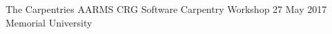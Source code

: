 \begin{cventries}
  \cventry
    {The Carpentries} %
    {AARMS CRG Software Carpentry Workshop} %
    {27 May 2017} %
    {Memorial University} %
    {
    }


\end{cventries}
